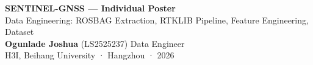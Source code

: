 \documentclass[20pt]{extarticle}
\begin{document}
\noindent
\begin{tcolorbox}[colback=buaaNavy,colframe=buaaNavy,boxrule=0pt,arc=8pt,
                  left=16pt,right=16pt,top=10pt,bottom=10pt]
  \begin{center}
    {\fontsize{46}{54}\bfseries\color{white} SENTINEL-GNSS — Individual Poster}\\[6pt]
    {\fontsize{26}{32}\color{buaaSky}
     Data Engineering: ROSBAG Extraction, RTKLIB Pipeline, Feature Engineering, Dataset}\\[8pt]
    {\large\color{white}
     \textbf{Ogunlade Joshua} (LS2525237) \quad Data Engineer}\\[4pt]
    {\normalsize\color{white!70!buaaSky} H3I, Beihang University · Hangzhou · 2026}
  \end{center}
\end{tcolorbox}
\vspace{0.5cm}
\end{document}
